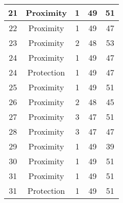 \documentclass[results.tex]{subfiles}
\begin{document}
\begin{center}
\begin{tabular}{| c || c | c | c | c |}
            \hline
            21                      & Proximity                    & 1                      & 49                      & 51                   \\
            \hline
            22                      & Proximity                    & 1                      & 49                      & 47                   \\
            \hline
            23                      & Proximity                    & 2                      & 48                      & 53                   \\
            \hline
            24                      & Proximity                    & 1                      & 49                      & 47                   \\
            \hline
            24                      & Protection                   & 1                      & 49                      & 47                   \\
            \hline
            25                      & Proximity                    & 1                      & 49                      & 51                   \\
            \hline
            26                      & Proximity                    & 2                      & 48                      & 45                   \\
            \hline
            27                      & Proximity                    & 3                      & 47                      & 51                   \\
            \hline
            28                      & Proximity                    & 3                      & 47                      & 47                   \\
            \hline
            29                      & Proximity                    & 1                      & 49                      & 39                   \\
            \hline
            30                      & Proximity                    & 1                      & 49                      & 51                   \\
            \hline
            31                      & Proximity                    & 1                      & 49                      & 51                   \\
            \hline
            31                      & Protection                   & 1                      & 49                      & 51                   \\

\end{tabular}
\end{center}
\end{document}
